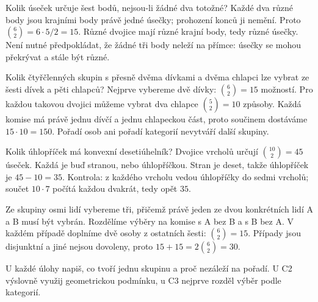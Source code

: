 \documentclass[11pt,a4paper]{article}
\begin{document}
\begin{prikladReseniBox}[title={Příklad P2}]
Kolik úseček určuje šest bodů, nejsou-li žádné dva totožné?
\tcblower
Každé dva různé body jsou krajními body právě jedné úsečky; prohození konců ji nemění. Proto $\binom62=6\cdot5/2=15$. Různé dvojice mají různé krajní body, tedy různé úsečky. Není nutné předpokládat, že žádné tři body neleží na přímce: úsečky se mohou překrývat a stále být různé.
\end{prikladReseniBox}


\begin{prikladReseniBox}[title={Příklad P3}]
Kolik čtyřčlenných skupin s přesně dvěma dívkami a dvěma chlapci lze vybrat ze šesti dívek a pěti chlapců?
\tcblower
Nejprve vybereme dvě dívky: $\binom62=15$ možností. Pro každou takovou dvojici můžeme vybrat dva chlapce $\binom52=10$ způsoby. Každá komise má právě jednu dívčí a jednu chlapeckou část, proto součinem dostáváme $15\cdot10=150$. Pořadí osob ani pořadí kategorií nevytváří další skupiny.
\end{prikladReseniBox}


\begin{prikladReseniBox}[title={Příklad P4}]
Kolik úhlopříček má konvexní desetiúhelník?
\tcblower
Dvojice vrcholů určují $\binom{10}{2}=45$ úseček. Každá je buď stranou, nebo úhlopříčkou. Stran je deset, takže úhlopříček je $45-10=35$. Kontrola: z každého vrcholu vedou úhlopříčky do sedmi vrcholů; součet $10\cdot7$ počítá každou dvakrát, tedy opět $35$.
\end{prikladReseniBox}


\begin{prikladReseniBox}[title={Příklad P5}]
Ze skupiny osmi lidí vybereme tři, přičemž právě jeden ze dvou konkrétních lidí A a B musí být vybrán.
\tcblower
Rozdělíme výběry na komise s A bez B a s B bez A. V každém případě doplníme dvě osoby z ostatních šesti: $\binom62=15$. Případy jsou disjunktní a jiné nejsou dovoleny, proto $15+15=2\binom62=30$.
\end{prikladReseniBox}


\newpage
{}

U každé úlohy napiš, co tvoří jednu skupinu a proč nezáleží na pořadí. U C2 výslovně využij geometrickou podmínku, u C3 nejprve rozděl výběr podle kategorií.
\end{document}
